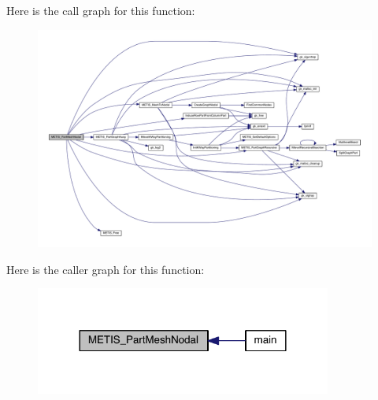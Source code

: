 Here is the call graph for this function\+:\nopagebreak
\begin{figure}[H]
\begin{center}
\leavevmode
\includegraphics[width=350pt]{a00236_ade1e7e23ad687989a6343b4fb8d61ba7_cgraph}
\end{center}
\end{figure}
Here is the caller graph for this function\+:\nopagebreak
\begin{figure}[H]
\begin{center}
\leavevmode
\includegraphics[width=276pt]{a00236_ade1e7e23ad687989a6343b4fb8d61ba7_icgraph}
\end{center}
\end{figure}
